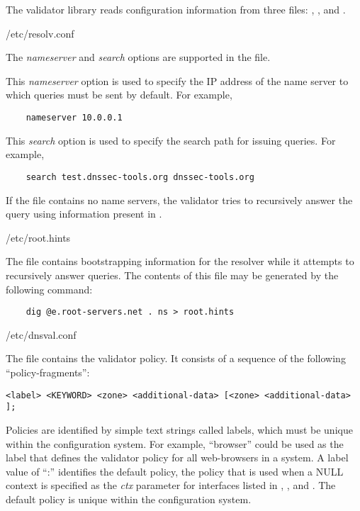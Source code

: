 The validator library reads configuration information from three
files: , , and
.

\begin{description}

\item /etc/resolv.conf\verb" "

The {\it nameserver} and {\it search} options are supported in the
 file.

This {\it nameserver} option is used to specify the IP address of the name
server to which queries must be sent by default.  For example,

\begin{verbatim}
    nameserver 10.0.0.1
\end{verbatim}

This {\it search} option is used to specify the search path for issuing
queries.  For example,

\begin{verbatim} 
    search test.dnssec-tools.org dnssec-tools.org
\end{verbatim}

If the  file contains no name servers, the validator 
tries to recursively answer the query using information present
in .

\item /etc/root.hints\verb" "

The  file contains bootstrapping information for the
resolver while it attempts to recursively answer queries.  The contents of
this file may be generated by the following command:

\begin{verbatim}
    dig @e.root-servers.net . ns > root.hints
\end{verbatim}

\item /etc/dnsval.conf\verb" "

The  file contains the validator policy.  It consists
of a sequence of the following ``policy-fragments'':

\begin{verbatim}
<label> <KEYWORD> <zone> <additional-data> [<zone> <additional-data> ];
\end{verbatim}

Policies are identified by simple text strings called labels, which must be
unique within the configuration system.  For example, ``browser'' could be
used as the label that defines the validator policy for all web-browsers in a
system.  A label value of ``:'' identifies the default policy, the policy that
is used when a NULL context is specified as the {\it ctx} parameter for
interfaces listed in , , and
.  The default policy is unique within the
configuration system.


\end{description}
